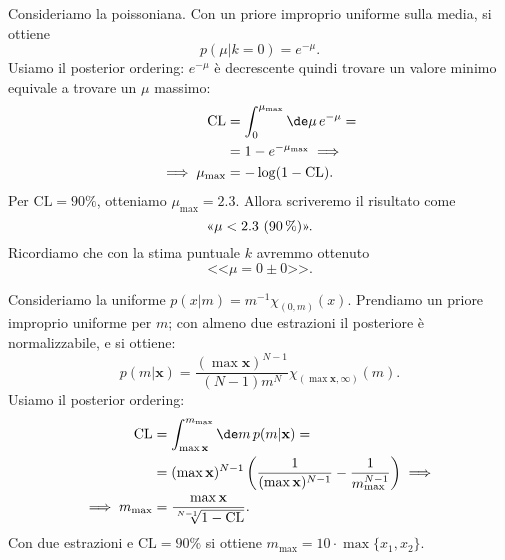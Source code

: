 \begin{example}
	\label{th:poissbayes}
	Consideriamo la poissoniana.
	Con un priore improprio uniforme sulla media, si ottiene
	\begin{equation*}
		p(\mu|k=0)
		= e^{-\mu}.
	\end{equation*}
	Usiamo il posterior ordering:
	$e^{-\mu}$ è decrescente quindi trovare un valore minimo equivale a trovare un $\mu$ massimo:
	\begin{align*}
		\mathrm{CL}
		&= \int_0^{\mu_\text{max}} \de\mu\, e^{-\mu} = \\
		&= 1 - e^{-\mu_\text{max}} \implies \\
		\implies \mu_\text{max}
		&= -\log(1-\mathrm{CL}).
	\end{align*}
	Per $\mathrm{CL}=\SI{90}\%$,
	otteniamo $\mu_\text{max}=2.3$.
	Allora scriveremo il risultato come
	\begin{equation*}
		\text{<<$\mu < 2.3$ (\SI{90}\%)>>.}
	\end{equation*}
	Ricordiamo che con la stima puntuale $k$ avremmo ottenuto
	\begin{equation*}
		\text{<<}\mu = 0 \pm 0\text{>>.}
	\end{equation*}
\end{example}

\begin{example}
	Consideriamo la uniforme $p(x|m)=m^{-1}\chi_{(0,m)}(x)$.
	Prendiamo un priore improprio uniforme per $m$;
	con almeno due estrazioni il posteriore è normalizzabile, e si ottiene:
	\begin{equation*}
		p(m|\mathbf x)
		= \frac{(\max\mathbf x)^{N-1}}{(N-1)m^N}\chi_{(\max\mathbf x,\infty)}(m).
	\end{equation*}
	Usiamo il posterior ordering:
	\begin{align*}
		\mathrm{CL}
		&= \int_{\max\mathbf x}^{m_\mathrm{max}} \de m\,p(m|\mathbf x) = \\
		&= (\max\mathbf x)^{N-1}
		\left( \frac1{(\max\mathbf x)^{N-1}} - \frac1{m_\mathrm{max}^{N-1}} \right) \implies \\
		\implies m_\mathrm{max}
		&= \frac {\max\mathbf x} {\sqrt[N-1]{1-\mathrm{CL}}}.
	\end{align*}
	Con due estrazioni e $\mathrm{CL}=\SI{90}\%$ si ottiene $m_\mathrm{max}=10\cdot\max\{x_1,x_2\}$.
\end{example}
